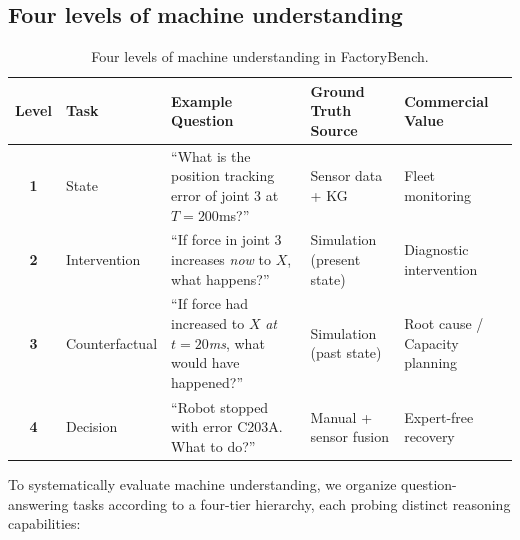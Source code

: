 \documentclass{article}
\begin{document}
\subsection{Four levels of machine understanding}


\begin{table}[t]
\centering
\caption{Four levels of machine understanding in FactoryBench.}
\label{tab:levels}
\small
\begin{tabular}{@{}clp{4.5cm}p{2.5cm}p{2.8cm}@{}}
\toprule
Level & Task & Example Question & Ground Truth Source & Commercial Value \\
\midrule
\textbf{1} & State & ``What is the position tracking error of joint 3 at $T=200$ms?'' & Sensor data + KG & Fleet monitoring \\
\textbf{2} & Intervention & ``If force in joint 3 increases \textit{now} to $X$, what happens?'' & Simulation (present state) & Diagnostic intervention \\
\textbf{3} & Counterfactual & ``If force had increased to $X$ \textit{at $t=20$ms}, what would have happened?'' & Simulation (past state) & Root cause / Capacity planning \\
\textbf{4} & Decision & ``Robot stopped with error C203A. What to do?'' & Manual + sensor fusion & Expert-free recovery \\
\bottomrule
\end{tabular}
\end{table}

To systematically evaluate machine understanding, we organize question-answering tasks according to a four-tier hierarchy, each probing distinct reasoning capabilities:
\end{document}
